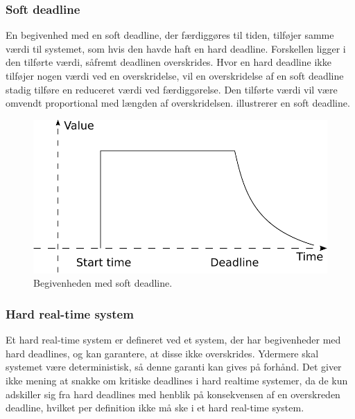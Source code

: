 \subsubsection{Soft deadline} 
En begivenhed med en soft deadline, der færdiggøres til tiden, tilføjer samme værdi til systemet, som hvis den havde haft en hard deadline. Forskellen ligger i den tilførte værdi, såfremt deadlinen overskrides. Hvor en hard deadline ikke tilføjer nogen værdi ved en overskridelse, vil en overskridelse af en soft deadline stadig tilføre en reduceret værdi ved færdiggørelse. Den tilførte værdi vil være omvendt proportional med længden af overskridelsen.  illustrerer en soft deadline. 

\begin{figure}
 \begin{center}
  \includegraphics[scale=0.75]{images/soft-deadline}
	\caption{Begivenheden med soft deadline.}
	\label{figure:soft-dl}
\end{center}
\end{figure}



\subsubsection{Hard real-time system}
Et hard real-time system er defineret ved et system, der har begivenheder med hard deadlines, og kan garantere, at disse ikke overskrides. Ydermere skal systemet være deterministisk, så denne garanti kan gives på forhånd. Det giver ikke mening at snakke om kritiske deadlines i hard realtime systemer, da de kun adskiller sig fra hard deadlines med henblik på konsekvensen af en overskreden deadline, hvilket per definition ikke må ske i et hard real-time system.  

